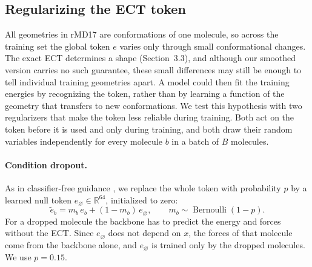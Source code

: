 \documentclass{article}
\newcommand{\R}{\mathbb{R}}
\newcommand{\enull}{e_{\varnothing}}
\begin{document}
\subsection{Regularizing the ECT token}
\label{sec:regularizers}
All geometries in rMD17 are conformations of one molecule, so across the training set the global token $e$ varies only through small conformational changes. The exact ECT determines a shape (Section~3.3), and although our smoothed version carries no such guarantee, these small differences may still be enough to tell individual training geometries apart. A model could then fit the training energies by recognizing the token, rather than by learning a function of the geometry that transfers to new conformations. We test this hypothesis with two regularizers that make the token less reliable during training. Both act on the token before it is used and only during training, and both draw their random variables independently for every molecule $b$ in a batch of $B$ molecules.

\paragraph{Condition dropout.}
As in classifier-free guidance \citep{ho2022cfg}, we replace the whole token with probability $p$ by a learned null token $\enull\in\R^{64}$, initialized to zero:
\begin{equation}
  \tilde e_b = m_b\, e_b + (1-m_b)\,\enull, \qquad m_b\sim\operatorname{Bernoulli}(1-p).
  \label{eq:cond-drop}
\end{equation}
For a dropped molecule the backbone has to predict the energy and forces without the ECT. Since $\enull$ does not depend on $x$, the forces of that molecule come from the backbone alone, and $\enull$ is trained only by the dropped molecules. We use $p = 0.15$.
\end{document}
